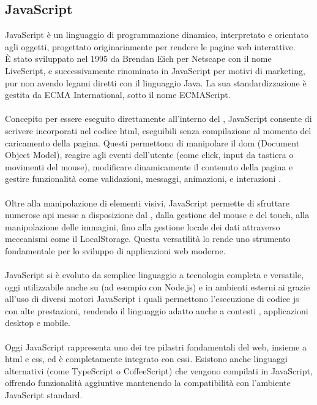 \subsection{JavaScript}
\noindent JavaScript è un linguaggio di programmazione dinamico, interpretato e orientato agli oggetti, progettato originariamente per rendere le pagine web interattive.\\ 
È stato sviluppato nel 1995 da Brendan Eich per Netscape con il nome LiveScript, e successivamente rinominato in JavaScript per motivi di marketing, pur non avendo legami diretti con il linguaggio Java. La sua standardizzazione è gestita da ECMA International, sotto il nome ECMAScript.\\
\\
Concepito per essere eseguito direttamente all’interno del , JavaScript consente di scrivere  incorporati nel codice \acrshort{html}, eseguibili senza compilazione al momento del caricamento della pagina. Questi  permettono di manipolare il \acrshort{dom} (Document Object Model), reagire agli eventi dell’utente (come click, input da tastiera o movimenti del mouse), modificare dinamicamente il contenuto della pagina e gestire funzionalità come validazioni, messaggi, animazioni, e interazioni .\\
\\
Oltre alla manipolazione di elementi visivi, JavaScript permette di sfruttare numerose \acrshort{api} messe a disposizione dal , dalla gestione del mouse e del touch, alla manipolazione delle immagini, fino alla gestione locale dei dati attraverso meccanismi come il LocalStorage. Questa versatilità lo rende uno strumento fondamentale per lo sviluppo di applicazioni web moderne.\\
\\
JavaScript si è evoluto da semplice linguaggio  a tecnologia completa e versatile, oggi utilizzabile anche su  (ad esempio con Node.js) e in ambienti esterni ai  grazie all’uso di diversi motori JavaScript i quali permettono l’esecuzione di codice \acrshort{js} con alte prestazioni, rendendo il linguaggio adatto anche a contesti , applicazioni desktop e mobile.\\
\\
Oggi JavaScript rappresenta uno dei tre pilastri fondamentali del web, insieme a \acrshort{html} e \acrshort{css}, ed è completamente integrato con essi. Esistono anche linguaggi alternativi (come TypeScript o CoffeeScript) che vengono compilati in JavaScript, offrendo funzionalità aggiuntive mantenendo la compatibilità con l’ambiente JavaScript standard.

